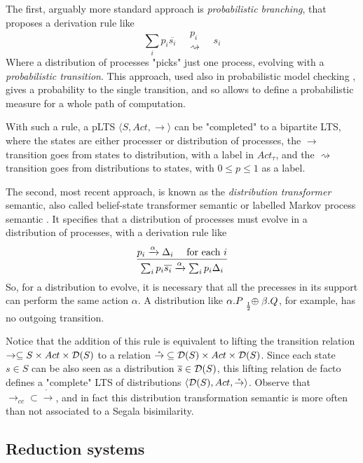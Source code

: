 The first, arguably more standard approach is \textit{probabilistic branching}, that proposes a derivation rule like
\[ \sum_i p_i \overline{s_i} \quad
\substack{  p_i  \\  \rightsquigarrow } 
\quad s_i \]
Where a distribution of processes "picks" just one process, evolving with a \textit{probabilistic transition}. This approach, used also in probabilistic model checking \cite{kwiatkowskaPRISMVerificationProbabilistic2011}, gives a probability to the single transition, and so allows to define a probabilistic measure for a whole path of computation.

With such a rule, a pLTS $\langle S, Act, \rightarrow\rangle$ can be "completed" to a bipartite LTS, where the states are either processer or distribution of processes, the $\rightarrow$ transition goes from states to distribution, with a label in $Act_\tau$, and the $\rightsquigarrow$ transition goes from distributions to states, with $0 \leq p \leq 1$ as a label. 

The second, most recent approach, is known as the \textit{distribution transformer} semantic, also called belief-state transformer semantic or labelled Markov process semantic . It specifies that a distribution of processes must evolve in a distribution of processes, with a derivation rule like 
\[ \infer{ \sum_i p_i \overline{s_i} \xrightarrow{\alpha} \sum_i p_i \Delta_i}
  { p_i \xrightarrow{\alpha} \Delta_i & \text{ for each  }i }
\]
So, for a distribution to evolve, it is necessary that all the precesses in its support can perform the same action $\alpha$. A distribution like $\alpha.P \psum{\frac{1}{2}} \beta.Q$, for example, has no outgoing transition.

Notice that the addition of this rule is equivalent to lifting the transition relation $\rightarrow \subseteq S \times Act \times \mathcal{D}(S)$ to a relation $\mathring{\rightarrow} \subseteq \mathcal{D}(S) \times Act \times \mathcal{D}(S)$. Since each state $s \in S$ can be also seen as a distribution $\overline{s} \in \mathcal{D}(S)$, this lifting relation de facto defines a "complete" LTS of distributions $\langle \mathcal{D}(S), Act, \mathring{\rightarrow}\rangle$. Observe that $\rightarrow_{cc} \subset \mathring{\rightarrow}$, and in fact this distribution transformation semantic is more often than not associated to a Segala bisimilarity.



\subsection{Reduction systems}\label{bkg_reduction_system}

